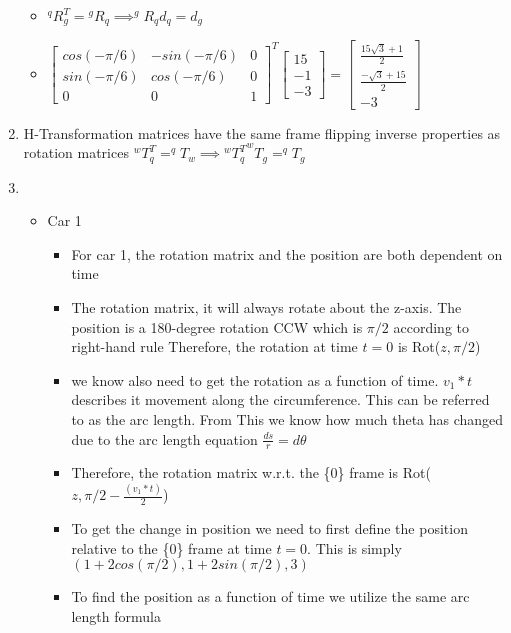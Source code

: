\documentclass[10pt]{article}
\begin{document}
\begin{enumerate}
  \begin{itemize}
    \item $^qR^{T}_g {=} {^gR_q} \implies ^gR_qd_q=d_g$
    \item $
      \begin{bmatrix}
       cos(-\pi/6) & -sin(-\pi/6) & 0 \\
       sin(-\pi/6) & cos(-\pi/6) & 0 \\
       0 & 0 & 1
      \end{bmatrix}^T
      \begin{bmatrix}
        15\\
        -1\\
        -3
      \end{bmatrix}
      =
      \begin{bmatrix}
        \frac{15\sqrt{3} +1}{2}\\
        \frac{-\sqrt{3} +15}{2}\\
        -3
      \end{bmatrix}
      $
  \end{itemize}
  \item H-Transformation matrices have the same frame flipping inverse properties as rotation matrices  $^wT^T_q=^qT_w \implies {^wT^T_q}^wT_g=^qT_g$
  \item
  \begin{itemize}
    \item Car 1
    \begin{itemize}
      \item For car 1, the rotation matrix and the position are both dependent on time
      \item The rotation matrix, it will always rotate about the z-axis. The
      position is a 180-degree rotation CCW which is $\pi/2$ according to right-hand rule
      Therefore, the rotation at time $t=0$ is Rot($z, \pi/2$)
      \item we know also need to get the rotation as a function of time. $v_1*t$ describes
      it movement along the circumference. This can be referred to as the arc length. From This
      we know how much theta has changed due to the arc length equation $\frac{ds}{r}=d\theta$ 
      \item Therefore, the rotation matrix w.r.t. the \{0\} frame is Rot($z, \pi/2-\frac{(v_1*t)}{2}$)
      \item To get the change in position we need to first define the position relative to the \{0\} frame at time 
      $t=0$. This is simply $(1+2cos(\pi/2),1+2sin(\pi/2),3)$ 
      \item To find the position as a function of time we utilize the same arc length formula

\end{itemize}
\end{itemize}
\end{enumerate}
\end{document}
